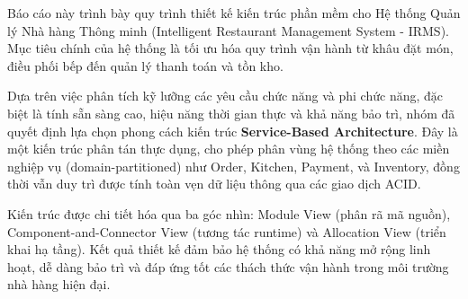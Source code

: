 Báo cáo này trình bày quy trình thiết kế kiến trúc phần mềm cho Hệ thống Quản lý Nhà hàng Thông minh (Intelligent Restaurant Management System - IRMS). Mục tiêu chính của hệ thống là tối ưu hóa quy trình vận hành từ khâu đặt món, điều phối bếp đến quản lý thanh toán và tồn kho.

Dựa trên việc phân tích kỹ lưỡng các yêu cầu chức năng và phi chức năng, đặc biệt là tính sẵn sàng cao, hiệu năng thời gian thực và khả năng bảo trì, nhóm đã quyết định lựa chọn phong cách kiến trúc \textbf{Service-Based Architecture}. Đây là một kiến trúc phân tán thực dụng, cho phép phân vùng hệ thống theo các miền nghiệp vụ (domain-partitioned) như Order, Kitchen, Payment, và Inventory, đồng thời vẫn duy trì được tính toàn vẹn dữ liệu thông qua các giao dịch ACID.

Kiến trúc được chi tiết hóa qua ba góc nhìn: Module View (phân rã mã nguồn), Component-and-Connector View (tương tác runtime) và Allocation View (triển khai hạ tầng). Kết quả thiết kế đảm bảo hệ thống có khả năng mở rộng linh hoạt, dễ dàng bảo trì và đáp ứng tốt các thách thức vận hành trong môi trường nhà hàng hiện đại.
